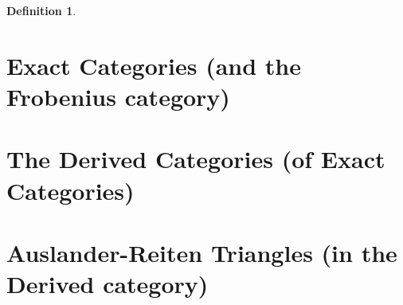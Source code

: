 \documentclass[12pt]{article}
\theoremstyle{definition}
\newtheorem{definition}{Definition}[section]
\theoremstyle{remark}
\begin{document}
\begin{definition}
\begin{enumerate}
                    \begin{center}
                    \end{center}
            \end{enumerate}
        \end{definition}
    \section{Exact Categories (and the Frobenius category)}
    \section{The Derived Categories (of Exact Categories)}
    \section{Auslander-Reiten Triangles (in the Derived category)}
\end{document}
